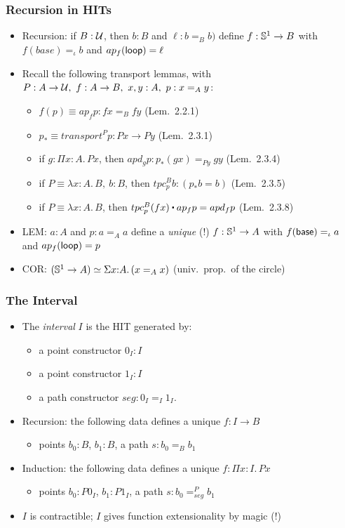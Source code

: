 \documentclass[handout]{beamer}
\newcommand{\depi}[3]{\Pi{#1{:}#2.\,#3}}
\newcommand{\sigm}[3]{\Sigma{#1{:}#2.\,#3}}
\newcommand{\lamt}[3]{\lambda{#1{:}#2.\,#3}}
\newcommand{\UU}{{\cal U}}
\newcommand{\ct}{%
  \mathchoice{\mathbin{\raisebox{0.5ex}{$\displaystyle\centerdot$}}}%
             {\mathbin{\raisebox{0.5ex}{$\centerdot$}}}%
             {\mathbin{\raisebox{0.25ex}{$\scriptstyle\,\centerdot\,$}}}%
             {\mathbin{\raisebox{0.1ex}{$\scriptscriptstyle\,\centerdot\,$}}}
}
\begin{document}
  \frame
  {
    \frametitle{Recursion in HITs}

    \begin{itemize}[<+->]
    \item Recursion: if ${B}:\UU$, %
    then $b:B$ and $\ell: b =_B b)$ define $f:{\mathbb{S}^1}\to{B}$
             with $f(base) =_\iota b$ and $ap_f(\mathsf{loop}) = \ell$
    \item Recall the following transport lemmas, with 
    $P:A\to\UU,~f:A\to B,~x,y:A,~p : x=_A y$:
    \begin{itemize}
\item $f(p)\equiv ap_f p : fx =_B fy$  (Lem.\ 2.2.1)
\item $p_* \equiv transport^P p : Px \to Py$  (Lem.\ 2.3.1)
\item if $g:\depi{x}{A}{Px}$, then $apd_g p : p_*(gx) =_{Py} gy$  (Lem.\ 2.3.4)
\item if $P\equiv\lamt{x}{A}{B},~{b:B}$, then $tpc^B_p b : {(p_* b = b)}$ (Lem.\ 2.3.5)
\item if $P\equiv\lamt{x}{A}{B}$, then $tpc^B_p (fx) \ct ap_f p = apd_f p$ (Lem.\ 2.3.8)
\end{itemize}
    \item LEM: $a:A$ and $p: a =_A a$ define a \emph{unique} (!) $f: \mathbb{S}^1 \to A$ 
             with $f(\mathsf{base}) =_\iota a$ and $ap_f(\mathsf{loop})= p$ %
    \item COR: $(\Sn^1 \to A) \simeq \sigm{x}{A}{(x =_A x)}$ (univ.\ prop.\ of the circle)
    \end{itemize}
  }
   
 \frame
  {
    \frametitle{The Interval}
    
\begin{itemize}    
    \item The \emph{interval} $I$ is the HIT generated by:
\begin{itemize}
\item a point constructor $0_I :I$
\item a point constructor $1_I :I$
\item a path constructor $seg : 0_I =_{I} 1_I$.
\end{itemize}
    \item Recursion: the following data defines a unique $f:I\to B$
\begin{itemize}
\item points $b_0 :B$, $b_1 :B$, a path $s : b_0 =_{B} b_1$
\end{itemize}
    \item Induction: the following data defines a unique $f:\depi{x}{I}{Px}$
\begin{itemize}
\item points $b_0 : P0_I$, $b_1 : P1_I$, a path $s : b_0 =^P_{seg} b_1$
\end{itemize}
    \item $I$ is contractible; $I$ gives function extensionality by magic (!) 
    \end{itemize}
  }
  
\end{document}
